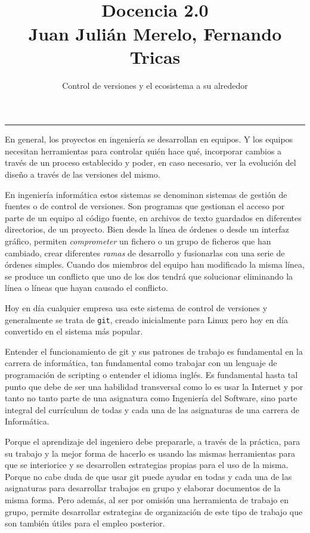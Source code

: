 \documentclass[twoside,10pt]{article}
\title{\ \\ Docencia 2.0\\ \large Juan Juli\'an Merelo, Fernando 
Tricas}
\author{\LARGE Control de versiones y el ecosistema a su alrededor}
\date{}
\newcounter{vol}
\begin{document}
\addtocounter{page}{2}

\maketitle
\vspace*{2ex}

\begin{multicols}{2}
\noindent\rule{86mm}{1pt}

En general, los proyectos en ingeniería se desarrollan en equipos. Y los equipos
necesitan herramientas para controlar quién hace qué, incorporar
cambios a través de un proceso establecido y poder, en caso necesario,
ver la evolución del diseño a través de las versiones del mismo.

En ingeniería informática estos sistemas se denominan sistemas de
gestión de fuentes o de control de versiones. Son programas que
gestionan el acceso por parte de un equipo al código fuente, en
archivos de texto guardados en diferentes directorios, de un
proyecto. Bien desde la línea de órdenes o desde un interfaz gráfico,
permiten  {\em comprometer} un fichero o un grupo de ficheros que han
cambiado, crear diferentes {\em ramas} de desarrollo y fusionarlas con
una serie de órdenes simples. Cuando dos miembros del equipo han
modificado la misma línea, se produce un conflicto que uno de los dos
tendrá que solucionar eliminando la línea o líneas que hayan causado
el conflicto.

Hoy en día cualquier empresa usa este sistema de control de versiones
y generalmente se trata de {\tt git}, creado inicialmente para Linux
pero hoy en día convertido en el sistema más
popular. 

Entender el funcionamiento de git y sus patrones de trabajo es fundamental en la carrera de
informática, tan fundamental como trabajar con un lenguaje de
programación de scripting o entender el idioma inglés. Es fundamental
hasta tal punto que debe de ser una habilidad transversal como lo es
usar la Internet y por tanto no tanto parte de una asignatura como
Ingeniería del Software, sino parte integral del currículum de todas y
cada una de las asignaturas de una carrera de Informática. 

Porque el aprendizaje del ingeniero debe prepararle, a través de la
práctica, para su trabajo y la mejor forma de hacerlo es usando las
mismas herramientas para que se interiorice y se desarrollen
estrategias propias para el uso de la misma. Porque no cabe duda de
que usar git puede ayudar en todas y cada una de las asignaturas para
desarrollar trabajos en grupo y elaborar documentos de la misma
forma. Pero además, al ser por omisión una herramienta de trabajo en
grupo, permite desarrollar estrategias de organización de este tipo de
trabajo que son también útiles para el empleo posterior.


\end{multicols}
\end{document}
